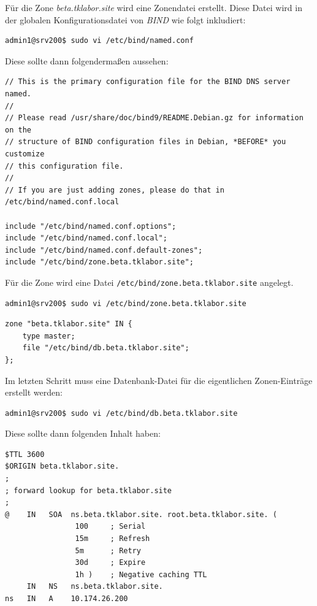 Für die Zone \textit{beta.tklabor.site} wird eine Zonendatei erstellt. Diese
Datei wird in der globalen Konfigurationsdatei von \textit{BIND} wie folgt
inkludiert:

\begin{lstlisting}
admin1@srv200$ sudo vi /etc/bind/named.conf
\end{lstlisting}

Diese sollte dann folgendermaßen aussehen:

\begin{scriptsize}
\begin{lstlisting}
// This is the primary configuration file for the BIND DNS server named.
//
// Please read /usr/share/doc/bind9/README.Debian.gz for information on the 
// structure of BIND configuration files in Debian, *BEFORE* you customize 
// this configuration file.
//
// If you are just adding zones, please do that in /etc/bind/named.conf.local

include "/etc/bind/named.conf.options";
include "/etc/bind/named.conf.local";
include "/etc/bind/named.conf.default-zones";
include "/etc/bind/zone.beta.tklabor.site";
\end{lstlisting}
\end{scriptsize}

Für die Zone wird eine Datei \texttt{/etc/bind/zone.beta.tklabor.site}
angelegt.

\begin{lstlisting}
admin1@srv200$ sudo vi /etc/bind/zone.beta.tklabor.site
\end{lstlisting}

\begin{scriptsize}
\begin{lstlisting}
zone "beta.tklabor.site" IN {
	type master;
	file "/etc/bind/db.beta.tklabor.site";
};
\end{lstlisting}
\end{scriptsize}

Im letzten Schritt muss eine Datenbank-Datei für die eigentlichen
Zonen-Einträge erstellt werden:

\begin{lstlisting}
admin1@srv200$ sudo vi /etc/bind/db.beta.tklabor.site
\end{lstlisting}

Diese sollte dann folgenden Inhalt haben:

\begin{scriptsize}
\begin{lstlisting}
$TTL 3600
$ORIGIN beta.tklabor.site.
;
; forward lookup for beta.tklabor.site
;
@    IN   SOA  ns.beta.tklabor.site. root.beta.tklabor.site. ( 
				100		; Serial
				15m		; Refresh
				5m		; Retry
				30d		; Expire
				1h )	; Negative caching TTL
     IN   NS   ns.beta.tklabor.site.
ns   IN   A    10.174.26.200
\end{lstlisting}
\end{scriptsize}

